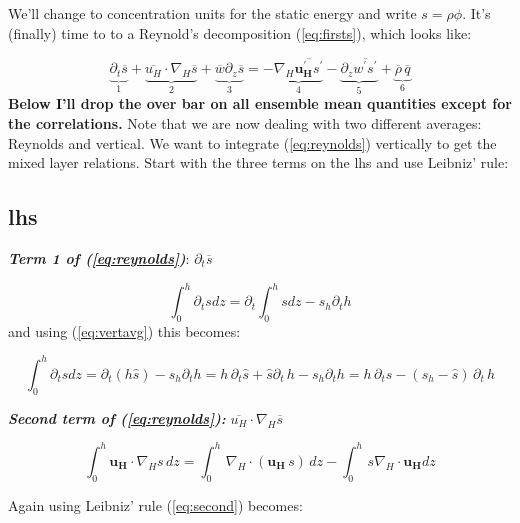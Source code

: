 \documentclass[12pt]{article}
\newcommand{\vect}[1]{\mathbf{{#1}}}
\begin{document}
We'll change to concentration units for the static energy and write $s=\rho \phi$.
It's (finally) time to to a Reynold's decomposition (\ref{eq:firsts}),
which looks like:

\begin{equation}
  \label{eq:reynolds}
  \underbrace{\partial_t \overline{s}}_1 + \underbrace{\overline{u_H} \cdot \nabla_H \overline{s}}_2
+ \underbrace{\overline{w} \partial_z \overline{s}}_3 = -\underbrace{\nabla_H \overline{\vect{u_H^\prime} s^\prime}}_4
- \underbrace{\partial_z \overline{w^\prime s^\prime}}_5 + \underbrace{\overline{\rho}\,\overline{q}}_6
\end{equation}
\textbf{Below I'll drop the over bar on all ensemble mean quantities except for the 
correlations.} Note that we are now dealing with two different averages: Reynolds and vertical.
We want to integrate (\ref{eq:reynolds}) vertically to get the mixed layer relations.  Start with the three
terms on the lhs and use Leibniz' rule:


\subsection{lhs}

\noindent
\textit{\textbf{Term 1 of (\ref{eq:reynolds})}}: $\partial_t \overline{s}$

\begin{equation}
  \label{eq:term1}
  \int_0^h \partial_t s dz = \partial_t \int_0^h s dz - s_h \partial_t h
\end{equation}
and using (\ref{eq:vertavg}) this becomes:

\begin{equation}
  \label{eq:term1b}
  \int_0^h \partial_t s dz = \partial_t ( h \hat{s} ) - s_h \partial_t h
= h \, \partial_t \hat{s} + \hat{s} \partial_t\,h - s_h \partial_t h
= h \, \partial_t \hat{s} - (s_h -  \hat{s}) \, \partial_t\,h 
\end{equation}

\noindent
\textbf{\textit{Second term of (\ref{eq:reynolds}):}} $\overline{u_H} \cdot \nabla_H \overline{s}$

\begin{equation}
  \label{eq:second}
  \int_0^h \vect{u_H} \cdot \nabla_H s \, dz =
\int_0^h \, \nabla_H \cdot ( \vect{u_H} \, s ) \, dz -  
\int_0^h\, s \nabla_H \cdot \vect{u_H} dz
\end{equation}

Again using Leibniz' rule (\ref{eq:second}) becomes:
\end{document}
